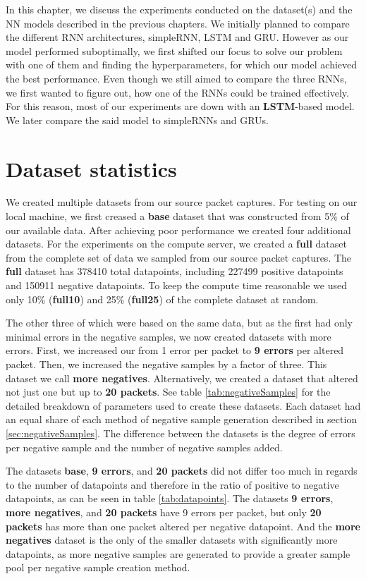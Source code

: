 \documentclass[
	ngerman,
	ruledheaders=section,%
	class=report,%
	thesis={type=bachelor},%
	accentcolor=9c,%
	custommargins=true,%
	marginpar=false,%
	parskip=half-,%
	fontsize=11pt,%
]{tudapub}
\begin{document}
In this chapter, we discuss the experiments conducted on the dataset(s) and the NN models described in the previous chapters.
We initially planned to compare the different RNN architectures, simpleRNN, LSTM and GRU.
However as our model performed suboptimally, we first shifted our focus to solve our problem with one of them and finding the hyperparameters, for which our model achieved the best performance.
Even though we still aimed to compare the three RNNs, we first wanted to figure out, how one of the RNNs could be trained effectively.
For this reason, most of our experiments are down with an \textbf{LSTM}-based model.
We later compare the said model to simpleRNNs and GRUs.

\section{Dataset statistics}
\label{sec:datasetStats}

We created multiple datasets from our source packet captures.
For testing on our local machine, we first creased a \textbf{base} dataset that was constructed from 5\% of our available data.
After achieving poor performance we created four additional datasets.
For the experiments on the compute server, we created a \textbf{full} dataset from the complete set of data we sampled from our source packet captures.
The \textbf{full} dataset has 378410 total datapoints, including 227499 positive datapoints and 150911 negative datapoints.
To keep the compute time reasonable we used only 10\% (\textbf{full10}) and 25\% (\textbf{full25}) of the complete dataset at random.

The other three of which were based on the same data, but as the first had only minimal errors in the negative samples, we now created datasets with more errors.
First, we increased our from 1 error per packet to \textbf{9 errors} per altered packet.
Then, we increased the negative samples by a factor of three. This dataset we call \textbf{more negatives}.
Alternatively, we created a dataset that altered not just one but up to \textbf{20 packets}.
See table \ref{tab:negativeSamples} for the detailed breakdown of parameters used to create these datasets.
Each dataset had an equal share of each method of negative sample generation described in section \ref{sec:negativeSamples}.
The difference between the datasets is the degree of errors per negative sample and the number of negative samples added.

The datasets \textbf{base}, \textbf{9 errors}, and \textbf{20 packets} did not differ too much in regards to the number of datapoints and therefore in the ratio of positive to negative datapoints, as can be seen in table \ref{tab:datapoints}.
The datasets \textbf{9 errors}, \textbf{more negatives}, and \textbf{20 packets} have 9 errors per packet, but only \textbf{20 packets} has more than one packet altered per negative datapoint.
And the \textbf{more negatives} dataset is the only of the smaller datasets with significantly more datapoints, as more negative samples are generated to provide a greater sample pool per negative sample creation method.
\end{document}
